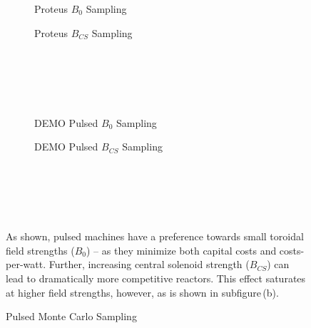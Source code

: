 \begin{figure*}
    \centering
    \hfill
    \begin{subfigure}[t]{0.45\textwidth}
        \centering
		\begin{adjustbox}{width=\textwidth}
			\Large
			
		\end{adjustbox}
        \caption{Proteus $B_0$ Sampling}
    \end{subfigure}
    \hfill
    \begin{subfigure}[t]{0.45\textwidth}
        \centering
		\begin{adjustbox}{width=\textwidth}
			\Large
			
		\end{adjustbox}
        \caption{Proteus $B_{CS}$ Sampling}
    \end{subfigure}
    \hfill \hfill ~\\ ~\\ ~\\ ~\\
    \hfill
    \begin{subfigure}[t]{0.45\textwidth}
        \centering
		\begin{adjustbox}{width=\textwidth}
			\Large
			
		\end{adjustbox}
        \caption{DEMO Pulsed $B_0$ Sampling}
    \end{subfigure}
    \hfill
    \begin{subfigure}[t]{0.45\textwidth}
        \centering
		\begin{adjustbox}{width=\textwidth}
			\Large
			
		\end{adjustbox}
        \caption{DEMO Pulsed $B_{CS}$ Sampling}
    \end{subfigure}
    \hfill \hfill ~\\ ~\\ ~\\
    \caption{Pulsed Monte Carlo Sampling} ~ \\
    \small{ As shown, pulsed machines have a preference towards small toroidal field strengths ($B_0$) -- as they minimize both capital costs and costs-per-watt. Further, increasing central solenoid strength ($B_{CS}$) can lead to dramatically more competitive reactors. This effect saturates at higher field strengths, however, as is shown in subfigure\,(b). }
    \label{fig:pulsed_samplings}
\end{figure*}

